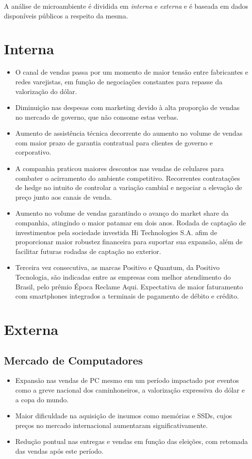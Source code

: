 A análise de microambiente é dividida em \emph{interna} e \emph{externa} e é baseada em dados disponíveis públicos a respeito da mesma\cite{positivo2t18}\cite{reclameAqui2018}.

\section{Interna}

\begin{itemize}
\item O canal de vendas passa por um momento de maior tensão entre fabricantes e redes varejistas, em função de negociações constantes para repasse da valorização do dólar.
\item Diminuição nas despesas com marketing devido à alta proporção de vendas no mercado de governo, que não consome estas verbas.
\item Aumento de assistência técnica decorrente do aumento no volume de vendas com maior prazo de garantia contratual para clientes de governo e corporativo.
\item A companhia praticou maiores descontos nas vendas de celulares para combater o acirramento do ambiente competitivo.
Recorrentes contratações de hedge no intuito de controlar a variação cambial e negociar a elevação de preço junto aos canais de venda.
\item Aumento no volume de vendas garantindo o avanço do market share da companhia, atingindo o maior patamar em dois anos.
Rodada de captação de investimentos pela sociedade investida Hi Technologies S.A. afim de proporcionar maior robustez financeira para suportar sua expansão, além de facilitar futuras rodadas de captação no exterior.
\item Terceira vez consecutiva, as marcas Positivo e Quantum, da Positivo Tecnologia, são indicadas entre as empresas com melhor atendimento do Brasil, pelo prêmio Época Reclame Aqui.
Expectativa de maior faturamento com smartphones integrados a terminais de pagamento de débito e crédito.

\end{itemize}

\section{Externa}
\subsection{Mercado de Computadores}
\begin{itemize}
\item Expansão nas vendas de PC mesmo em um período impactado por eventos como a greve nacional dos caminhoneiros, a valorização expressiva do dólar e a copa do mundo.
\item Maior dificuldade na aquisição de insumos como memórias e SSDs, cujos preços no mercado internacional aumentaram significativamente.
\item Redução pontual nas entregas e vendas em função das eleições, com retomada das vendas após este período.
\end{itemize}

